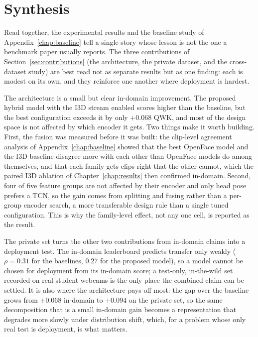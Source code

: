 \documentclass[../main.tex]{subfiles}
\begin{document}
\FloatBarrier
\section{Synthesis}
\label{sec:synthesis}

Read together, the experimental results and the baseline study of Appendix~\ref{chap:baseline} tell a single story whose lesson is not the one a benchmark paper usually reports. The three contributions of Section~\ref{sec:contributions} (the architecture, the private dataset, and the cross-dataset study) are best read not as separate results but as one finding: each is modest on its own, and they reinforce one another where deployment is hardest.

The architecture is a small but clear in-domain improvement. The proposed hybrid model with the I3D stream enabled scores higher than the baseline, but the best configuration exceeds it by only $+0.068$ QWK, and most of the design space is not affected by which encoder it gets. Two things make it worth building. First, the fusion was measured before it was built: the clip-level agreement analysis of Appendix~\ref{chap:baseline} showed that the best OpenFace model and the I3D baseline disagree more with each other than OpenFace models do among themselves, and that each family gets clips right that the other cannot, which the paired I3D ablation of Chapter~\ref{chap:results} then confirmed in-domain. Second, four of five feature groups are not affected by their encoder and only head pose prefers a TCN, so the gain comes from splitting and fusing rather than a per-group encoder search, a more transferable design rule than a single tuned configuration. This is why the family-level effect, not any one cell, is reported as the result.

The private set turns the other two contributions from in-domain claims into a deployment test. The in-domain leaderboard predicts transfer only weakly ($\rho=0.31$ for the baselines, 0.27 for the proposed model), so a model cannot be chosen for deployment from its in-domain score; a test-only, in-the-wild set recorded on real student webcams is the only place the combined claim can be settled. It is also where the architecture pays off most: the gap over the baseline grows from $+0.068$ in-domain to $+0.094$ on the private set, so the same decomposition that is a small in-domain gain becomes a representation that degrades more slowly under distribution shift, which, for a problem whose only real test is deployment, is what matters.
\end{document}
